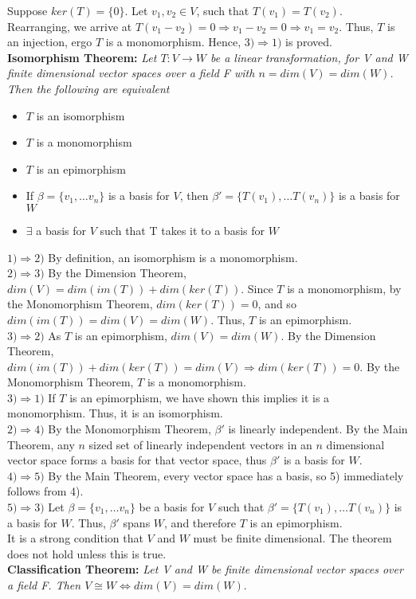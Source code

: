 \documentclass[12pt]{article}
\begin{document}
Suppose $ker(T) = \{ 0 \}$. Let $v_1, v_2 \in V$, such that $T(v_1) = T(v_2)$. Rearranging, we arrive at $T(v_1 - v_2) = 0 \Rightarrow v_1 - v_2 = 0 \Rightarrow v_1 = v_2$. Thus, $T$ is an injection, ergo $T$ is a monomorphism. Hence, $3) \Rightarrow 1)$ is proved.\\
 
 
\textbf{Isomorphism Theorem: }\emph{Let $T: V \rightarrow W$ be a linear transformation, for V and W finite dimensional vector spaces over a field F with $n = dim(V) = dim(W)$. Then the following are equivalent}
\begin{itemize}
\item $T$ is an isomorphism
\item $T$ is a monomorphism
\item $T$ is an epimorphism
\item If $\beta = \{ v_1, \dots v_n \}$ is a basis for $V$, then $\beta' = \{ T(v_1), \dots T(v_n) \}$ is a basis for $W$
\item $\exists$ a basis for $V$ such that T takes it to a basis for $W$
\end{itemize}
$1) \Rightarrow 2)$ By definition, an isomorphism is a monomorphism.\\

$2) \Rightarrow 3)$ By the Dimension Theorem, $dim(V) = dim(im(T)) + dim(ker(T))$. Since $T$ is a monomorphism, by the Monomorphism Theorem, $dim(ker(T)) = 0$, and so $dim(im(T)) = dim(V) = dim(W)$. Thus, $T$ is an epimorphism.\\

$3) \Rightarrow 2)$ As $T$ is an epimorphism, $dim(V) = dim(W)$. By the Dimension Theorem, $dim(im(T)) + dim(ker(T)) = dim(V) \Rightarrow dim(ker(T)) = 0$. By the Monomorphism Theorem, $T$ is a monomorphism.\\

$3) \Rightarrow 1)$ If $T$ is an epimorphism, we have shown this implies it is a monomorphism. Thus, it is an isomorphism.\\

$2) \Rightarrow 4)$ By the Monomorphism Theorem, $\beta'$ is linearly independent. By the Main Theorem, any $n$ sized set of linearly independent vectors in an $n$ dimensional vector space forms a basis for that vector space, thus $\beta'$ is a basis for $W$.\\

$4) \Rightarrow 5)$ By the Main Theorem, every vector space has a basis, so 5) immediately follows from 4).\\

$5) \Rightarrow 3)$ Let $\beta = \{ v_1, \dots v_n \}$ be a basis for $V$ such that $\beta' = \{ T(v_1), \dots T(v_n) \}$ is a basis for $W$. Thus, $\beta'$ spans $W$, and therefore $T$ is an epimorphism.\\

It is a strong condition that $V$ and $W$ must be finite dimensional. The theorem does not hold unless this is true.\\

\textbf{Classification Theorem: }\emph{Let V and W be finite dimensional vector spaces over a field F. Then $V \cong W \Leftrightarrow dim(V) = dim(W)$}.
\end{document}
